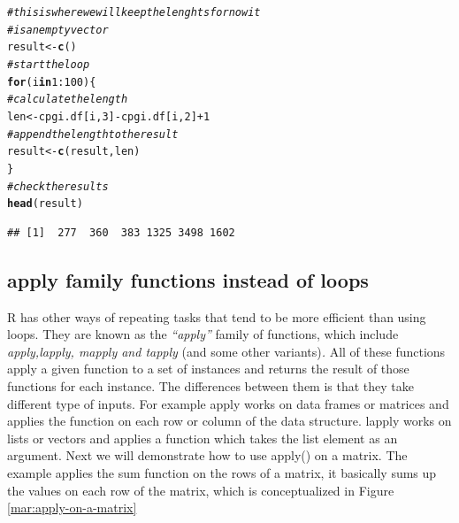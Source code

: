 \documentclass[english,nohyper]{tufte-book}\usepackage[]{graphicx}\usepackage[]{color}
\makeatletter
\newcommand{\hlnum}[1]{\textcolor[rgb]{0.686,0.059,0.569}{#1}}%
\newcommand{\hlcom}[1]{\textcolor[rgb]{0.678,0.584,0.686}{\textit{#1}}}%
\newcommand{\hlopt}[1]{\textcolor[rgb]{0,0,0}{#1}}%
\newcommand{\hlstd}[1]{\textcolor[rgb]{0.345,0.345,0.345}{#1}}%
\newcommand{\hlkwa}[1]{\textcolor[rgb]{0.161,0.373,0.58}{\textbf{#1}}}%
\newcommand{\hlkwb}[1]{\textcolor[rgb]{0.69,0.353,0.396}{#1}}%
\newcommand{\hlkwd}[1]{\textcolor[rgb]{0.737,0.353,0.396}{\textbf{#1}}}%
\newenvironment{kframe}{%
 \def\at@end@of@kframe{}%
 \ifinner\ifhmode%
  \def\at@end@of@kframe{\end{minipage}}%
  \begin{minipage}{\columnwidth}%
 \fi\fi%
 \def\FrameCommand##1{\hskip\@totalleftmargin \hskip-\fboxsep
 \colorbox{shadecolor}{##1}\hskip-\fboxsep
     \hskip-\linewidth \hskip-\@totalleftmargin \hskip\columnwidth}%
 \MakeFramed {\advance\hsize-\width
   \@totalleftmargin\z@ \linewidth\hsize
   \@setminipage}}%
 {\par\unskip\endMakeFramed%
 \at@end@of@kframe}
\newenvironment{knitrout}{}{} %
\makeatother
\begin{document}
\begin{knitrout}
\color{fgcolor}\begin{kframe}
\begin{alltt}
\hlcom{# this is where we will keep the lenghts for now it}
\hlcom{# is an empty vector}
\hlstd{result} \hlkwb{<-} \hlkwd{c}\hlstd{()}
\hlcom{# start the loop}
\hlkwa{for} \hlstd{(i} \hlkwa{in} \hlnum{1}\hlopt{:}\hlnum{100}\hlstd{) \{}
    \hlcom{# calculate the length}
    \hlstd{len} \hlkwb{<-} \hlstd{cpgi.df[i,} \hlnum{3}\hlstd{]} \hlopt{-} \hlstd{cpgi.df[i,} \hlnum{2}\hlstd{]} \hlopt{+} \hlnum{1}
    \hlcom{# append the length to the result}
    \hlstd{result} \hlkwb{<-} \hlkwd{c}\hlstd{(result, len)}
\hlstd{\}}
\hlcom{# check the results}
\hlkwd{head}\hlstd{(result)}
\end{alltt}
\begin{verbatim}
## [1]  277  360  383 1325 3498 1602
\end{verbatim}
\end{kframe}
\end{knitrout}



\subsection{apply family functions instead of loops}

R has other ways of repeating tasks that tend to be more efficient
than using loops. They are known as the \emph{``apply''} family
of functions, which include \emph{apply,lapply, mapply and tapply}
(and some other variants)\emph{.} All of these functions apply a given
function to a set of instances and returns the result of those functions
for each instance. The differences between them is that they take
different type of inputs. For example apply works on data frames or
matrices and applies the function on each row or column of the data
structure. lapply works on lists or vectors and applies a function
which takes the list element as an argument. Next we will demonstrate
how to use apply() on a matrix. The example applies the sum function
on the rows of a matrix, it basically sums up the values on each row
of the matrix, which is conceptualized in Figure \ref{mar:apply-on-a-matrix}
\end{document}
